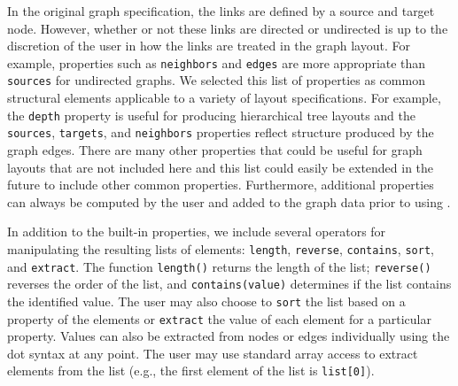 
In the original graph specification, the links are defined by a source
and target node. However, whether or not these links are
directed or undirected is up to the discretion of the user in how the links
are treated in the graph layout. For example, properties such as
\texttt{neighbors} and \texttt{edges} are more appropriate than \texttt{sources}
for undirected graphs. We selected this list of properties as common structural elements
applicable to a variety of layout specifications. For example, the \texttt{depth}
property is useful for producing hierarchical tree layouts and the 
\texttt{sources}, \texttt{targets}, and \texttt{neighbors} properties
reflect structure produced by the graph edges. There are many other
properties that could be useful for graph layouts that are not included 
here and this list could easily be extended in the future to include other
common properties. Furthermore, additional properties can always be
computed by the user and added to the graph data prior to using \projectname.

In addition to the built-in properties, we include several operators for 
manipulating the resulting lists of elements: \texttt{length}, \texttt{reverse},
\texttt{contains}, \texttt{sort}, and \texttt{extract}. The function 
\texttt{length()} returns the length of the list; \texttt{reverse()} 
reverses the order of the list, and \texttt{contains(value)} determines if
the list contains the identified value. The user may also choose to \texttt{sort} 
the list based on a property of the elements or \texttt{extract} the value of each
element for a particular property. Values can also be extracted from
nodes or edges individually using the dot syntax at any point. The user may use standard
array access to extract elements from the list (e.g., the first element of
the list is \texttt{list[0]}).



